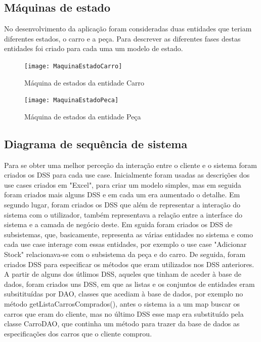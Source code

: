 \documentclass[10pt, a4paper]{article}
\begin{document}
\subsection{Máquinas de estado}
No desenvolvimento da aplicação foram consideradas duas entidades que teriam diferentes estados, o carro e a peça. Para descrever as diferentes fases destas entidades foi criado para cada uma um modelo de estado.

\begin{figure}[!htb]
\centering
\texttt{[image: MaquinaEstadoCarro]}
\caption{Máquina de estados da entidade Carro}
\label{ME_Carro}
\end{figure}

\begin{figure}[!htb]
\centering
\texttt{[image: MaquinaEstadoPeca]}
\caption{Máquina de estados da entidade Peça}
\label{ME_Peca}
\end{figure}

\subsection{Diagrama de sequência de sistema}
Para se obter uma melhor perceção da interação entre o cliente e o sistema foram criados os DSS para cada use case. Inicialmente foram usadas as descrições dos use cases criados em "Excel", para criar um modelo simples, mas em seguida foram criados mais alguns DSS e em cada um era aumentado o detalhe. Em segundo lugar, foram criados os DSS que além de representar a interação do sistema com o utilizador, também representava a relação entre a interface do sistema e a camada de negócio deste. Em sguida foram criados os DSS de subsistemas, que, basicamente, representa as várias entidades no sistema e como cada use case interage com essas entidades, por exemplo o use case "Adicionar Stock" relacionava-se com o subsistema da peça e do carro. De seguida, foram criados DSS para especificar os métodos que eram utilizados nos DSS anteriores. A partir de alguns dos útlimos DSS, aqueles que tinham de aceder à base de dados, foram criados uns DSS, em que as listas e os conjuntos de entidades eram subsitituídas por DAO, classes que acediam à base de dados, por exemplo no método getListaCarrosComprados(), antes o sistema ia a um map buscar os carros que eram do cliente, mas no último DSS esse map era substituído pela classe CarroDAO, que continha um método para trazer da base de dados as especificações dos carros que o cliente comprou.
\end{document}
